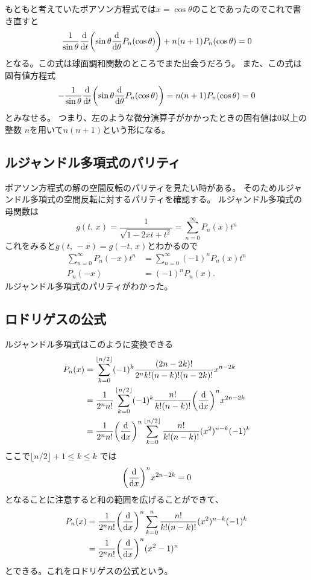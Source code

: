 \documentclass[../../master.tex]{subfiles}
\begin{document}
もともと考えていたポアソン方程式では\(x=\cos\theta\)のことであったのでこれで書き直すと
\begin{equation}
	\frac{1}{\sin\theta}\dv{t}\qty(\sin\theta\dv{\theta}P_n(\cos\theta)) + n(n+1)P_n(\cos\theta) =0 \label{eq:legendre_dif_eq2}
\end{equation}
となる。この式は球面調和関数のところでまた出会うだろう。
また、この式は固有値方程式
\begin{equation}
	-\frac{1}{\sin\theta}\dv{t}\qty(\sin\theta\dv{\theta}P_n(\cos\theta)) = n(n+1)P_n(\cos\theta) =0
\end{equation}
とみなせる。
つまり、左のような微分演算子がかかったときの固有値は0以上の整数
\(n\)を用いて\(n(n+1)\)という形になる。

\subsection{ルジャンドル多項式のパリティ}
ポアソン方程式の解の空間反転のパリティを見たい時がある。
そのためルジャンドル多項式の空間反転に対するパリティを確認する。
ルジャンドル多項式の母関数は
\begin{equation}
	g(t,\,x) = \frac{1}{\sqrt{1-2xt + t^2}} = \sum_{n=0}^{\infty}P_n(x)t^n
\end{equation}
これをみると\(g(t,\,-x)=g(-t,\,x)\)とわかるので
\begin{align}
	\sum_{n=0}^{\infty} P_n(-x)t^n & = \sum_{n=0}^{\infty} (-1)^n P_n(x)t^n \\
	P_n(-x)                        & = (-1)^n P_n(x).
\end{align}
ルジャンドル多項式のパリティがわかった。

\subsection{ロドリゲスの公式}
ルジャンドル多項式はこのように変換できる
\begin{align}
	P_n(x) & = \sum_{k=0}^{\lfloor n/2 \rfloor}(-1)^k \frac{(2n-2k)!}{2^n k!(n-k)!(n-2k)!}x^{n-2k}                \\
	       & =\frac{1}{2^n n!}\sum_{k=0}^{\lfloor n/2 \rfloor}(-1)^k \frac{n!}{k!(n-k)!}\qty(\dv{x})^nx^{2n-2k}   \\
	       & =\frac{1}{2^n n!}\qty(\dv{x})^n\sum_{k=0}^{\lfloor n/2 \rfloor} \frac{n!}{k!(n-k)!}(x^2)^{n-k}(-1)^k
\end{align}
ここで\(\lfloor n/2 \rfloor + 1 \leq k \leq k\) では
\begin{equation}
	\qty(\dv{x})^n x^{2n-2k} =0
\end{equation}
となることに注意すると和の範囲を広げることができて、
\begin{align}
	P_n(x) & = \frac{1}{2^n n!}\qty(\dv{x})^n\sum_{k=0}^{n} \frac{n!}{k!(n-k)!}(x^2)^{n-k}(-1)^k \\
	       & = \frac{1}{2^n n!}\qty(\dv{x})^n(x^2-1)^n
\end{align}
とできる。これをロドリゲスの公式という。
\end{document}
